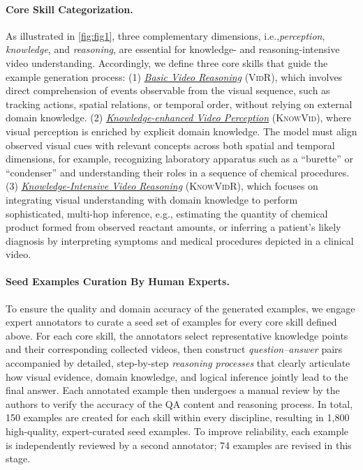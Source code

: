 \documentclass{llmxive}
\providecommand{\eg}{e.g.,\xspace}
\providecommand{\ie}{i.e.,\xspace}
\providecommand{\vr}{\textsc{VidR}\xspace}
\providecommand{\kv}{\textsc{KnowVid}\xspace}
\providecommand{\kvr}{\textsc{KnowVidR}\xspace}
\begin{document}
\paragraph{Core Skill Categorization.}
As illustrated in \autoref{fig:fig1}, three complementary dimensions, \ie \emph{perception}, \emph{knowledge}, and \emph{reasoning}, are essential for knowledge- and reasoning-intensive video understanding. Accordingly, we define three core skills that guide the example generation process:
(1) \underline{\emph{Basic Video Reasoning}} (\vr), which involves direct comprehension of events observable from the visual sequence, such as tracking actions, spatial relations, or temporal order, without relying on external domain knowledge.
(2) \underline{\emph{Knowledge-enhanced Video Perception}} (\kv), where visual perception is enriched by explicit domain knowledge. The model must align observed visual cues with relevant concepts across both spatial and temporal dimensions, for example, recognizing laboratory apparatus such as a ``burette'' or ``condenser'' and understanding their roles in a sequence of chemical procedures.
(3) \underline{\emph{Knowledge-Intensive Video Reasoning}} (\kvr), which focuses on integrating visual understanding with domain knowledge to perform sophisticated, multi-hop inference, \eg estimating the quantity of chemical product formed from observed reactant amounts, or inferring a patient’s likely diagnosis by interpreting symptoms and medical procedures depicted in a clinical video.

\vspace{-8pt}
\paragraph{Seed Examples Curation By Human Experts.}
To ensure the quality and domain accuracy of the generated examples, we engage expert annotators to curate a seed set of examples for every core skill defined above.
For each core skill, the annotators select representative knowledge points and their corresponding collected videos, then construct \emph{question–answer} pairs accompanied by detailed, step-by-step \emph{reasoning processes} that clearly articulate how visual evidence, domain knowledge, and logical inference jointly lead to the final answer.
Each annotated example then undergoes a manual review by the authors to verify the accuracy of the QA content and reasoning process. 
In total, 150 examples are created for each skill within every discipline, resulting in 1,800 high-quality, expert-curated seed examples. 
To improve reliability, each example is independently reviewed by a second annotator;
74 examples are revised in this stage.
\end{document}
